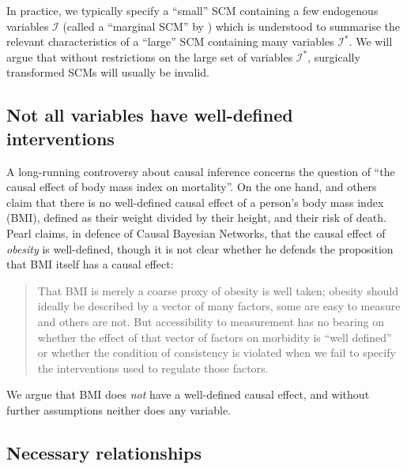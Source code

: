 In practice, we typically specify a ``small'' SCM containing a few endogenous variables $\mathcal{I}$ (called a ``marginal SCM'' by \citet{bongers_theoretical_2016}) which is understood to summarise the relevant characteristics of a ``large'' SCM containing many variables $\mathcal{I}^*$. We will argue that without restrictions on the large set of variables $\mathcal{I}^*$, surgically transformed SCMs will usually be invalid.


\subsection{Not all variables have well-defined interventions}

A long-running controversy about causal inference concerns the question of ``the causal effect of body mass index on mortality''. On the one hand, \citet{hernan_does_2008} and others claim that there is no well-defined causal effect of a person's body mass index (BMI), defined as their weight divided by their height, and their risk of death. Pearl claims, in defence of Causal Bayesian Networks, that the causal effect of \emph{obesity} is well-defined, though it is not clear whether he defends the proposition that BMI itself has a causal effect:

\begin{quote}
That BMI is merely a coarse proxy of obesity is well taken; obesity should ideally be described by a vector of many factors, some are easy to measure and others are not. But accessibility to measurement has no bearing on whether the effect of that vector of factors on morbidity is ``well defined'' or whether the condition of consistency is violated when we fail to specify the interventions used to regulate those factors. \citep{pearl_does_2018}
\end{quote}

We argue that BMI does \emph{not} have a well-defined causal effect, and without further assumptions neither does any variable.


\subsection{Necessary relationships}


